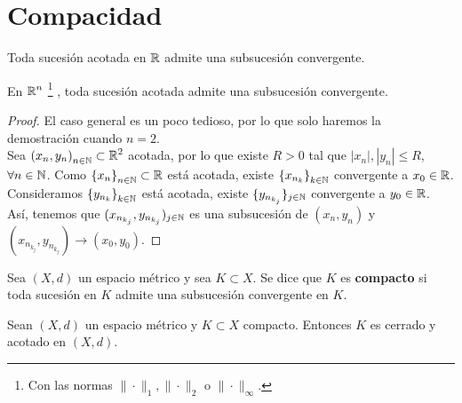 \section{Compacidad}
\begin{theorem}
Toda sucesión acotada en $\displaystyle \mathbb{R} $ admite una subsucesión convergente.
\end{theorem}
\begin{colorary}
En $\displaystyle \mathbb{R}^{n} $ \footnote{Con las normas $\displaystyle \| \cdot \|_{1}, \| \cdot \|_{2} $ o $\displaystyle \| \cdot \|_{\infty} $.} , toda sucesión acotada admite una subsucesión convergente. 
\end{colorary}
\begin{proof}
	El caso general es un poco tedioso, por lo que solo haremos la demostración cuando $\displaystyle n = 2 $. \\ 
	Sea $\displaystyle \left(x_{n}, y_{n}\right)_{n\in\mathbb{N}} \subset \mathbb{R}^{2} $ acotada, por lo que existe $\displaystyle R > 0 $ tal que $\displaystyle \left|x_{n}\right|, \left|y_{n}\right| \leq R $, $\displaystyle \forall n \in \mathbb{N} $. Como $\displaystyle \left\{ x_{n}\right\} _{n \in \mathbb{N}} \subset \mathbb{R}$ está acotada, existe $\displaystyle \left\{ x_{n_{k}}\right\} _{k \in \mathbb{N}} $ convergente a $\displaystyle x_{0} \in \mathbb{R} $. Consideramos $\displaystyle \left\{ y_{n_{k}}\right\} _{k \in \mathbb{N}} $ está acotada, existe $\displaystyle \{ y_{n_{k_{j}}}\} _{j \in \mathbb{N}} $ convergente a $\displaystyle y_{0} \in \mathbb{R} $.
	Así, tenemos que $\displaystyle (x_{n_{k_{j}}}, y_{n_{k_{j}}})_{j \in \mathbb{N}} $ es una subsucesión de $\displaystyle \left(x_{n}, y_{n}\right) $ y $\displaystyle (x_{n_{k_{j}}}, y_{n_{k_{j}}}) \to \left(x_{0}, y_{0}\right) $.
\end{proof}
\begin{definition}
Sea $\displaystyle \left(X,d\right) $ un espacio métrico y sea $\displaystyle K \subset X $. Se dice que $\displaystyle K $ es \textbf{compacto} si toda sucesión en $\displaystyle K $ admite una subsucesión convergente en $\displaystyle K $.
\end{definition}
\begin{lema}
Sean $\displaystyle \left(X,d\right) $ un espacio métrico y $\displaystyle K \subset X $ compacto. Entonces $\displaystyle K $ es cerrado y acotado en $\displaystyle \left(X,d\right) $.
\end{lema}
